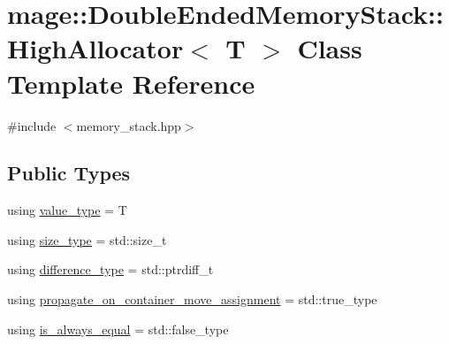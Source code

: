 \hypertarget{classmage_1_1_double_ended_memory_stack_1_1_high_allocator}{}\section{mage\+:\+:Double\+Ended\+Memory\+Stack\+:\+:High\+Allocator$<$ T $>$ Class Template Reference}
\label{classmage_1_1_double_ended_memory_stack_1_1_high_allocator}


{\ttfamily \#include $<$memory\+\_\+stack.\+hpp$>$}

\subsection*{Public Types}
\begin{DoxyCompactItemize}
\item 
using \mbox{\hyperlink{classmage_1_1_double_ended_memory_stack_1_1_high_allocator_aa1286d55a0e3d5a8cf281d5d29b0f058}{value\+\_\+type}} = T
\item 
using \mbox{\hyperlink{classmage_1_1_double_ended_memory_stack_1_1_high_allocator_a8f3f666efd2fdb95ca8a7fa82e6b0253}{size\+\_\+type}} = std\+::size\+\_\+t
\item 
using \mbox{\hyperlink{classmage_1_1_double_ended_memory_stack_1_1_high_allocator_a67fb3b3d9fcfd6f79d528aefd87be672}{difference\+\_\+type}} = std\+::ptrdiff\+\_\+t
\item 
using \mbox{\hyperlink{classmage_1_1_double_ended_memory_stack_1_1_high_allocator_a56caf83353fdcc547233d5b2169c897c}{propagate\+\_\+on\+\_\+container\+\_\+move\+\_\+assignment}} = std\+::true\+\_\+type
\item 
using \mbox{\hyperlink{classmage_1_1_double_ended_memory_stack_1_1_high_allocator_a81c407c8c9e727ce05fc86cf9e674104}{is\+\_\+always\+\_\+equal}} = std\+::false\+\_\+type
\end{DoxyCompactItemize}
